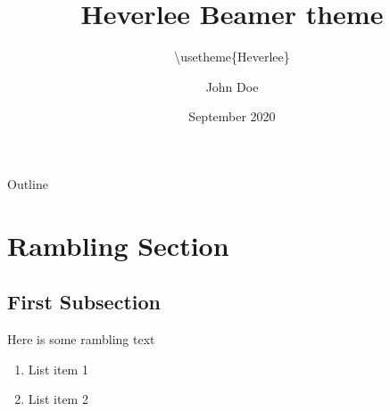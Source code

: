 \documentclass[10pt,t]{beamer}
\title[Heverlee \LaTeX\ Beamer theme]{Heverlee Beamer theme}
\subtitle{\textbackslash usetheme\{Heverlee\}}
\author{John Doe}
\institute{Placeholder University}
\date{September 2020}
\begin{document}

{


\begin{frame}
    \titlepage
\end{frame}
}		


\begin{frame}{Outline}
	\vskip 2mm
	\hfill	{\large \parbox{.95\textwidth}{\tableofcontents[hideothersubsections]}}
\end{frame}

\section{Rambling Section}

\subsection{First Subsection}
	
\begin{frame}
	Here is some rambling text
	\begin{enumerate}
		\item List item 1
		\item List item 2
	\end{enumerate}
\end{frame}
\end{document}
